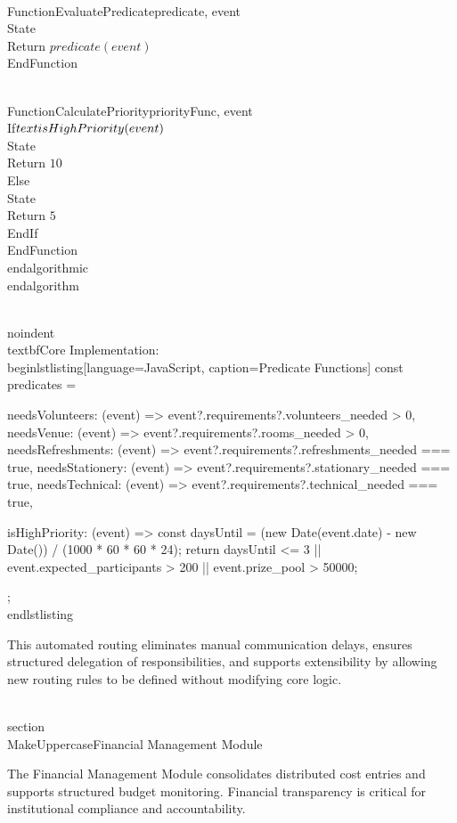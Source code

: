 \\Function{EvaluatePredicate}{predicate, event}
    \\State \\Return $predicate(event)$
\\EndFunction

\\Function{CalculatePriority}{priorityFunc, event}
    \\If{$\\text{isHighPriority}(event)$}
        \\State \\Return $10$
    \\Else
        \\State \\Return $5$
    \\EndIf
\\EndFunction
\\end{algorithmic}
\\end{algorithm}

\\noindent\\textbf{Core Implementation:}
\\begin{lstlisting}[language=JavaScript, caption=Predicate Functions]
const predicates = {
  needsVolunteers: (event) => event?.requirements?.volunteers_needed > 0,
  needsVenue: (event) => event?.requirements?.rooms_needed > 0,
  needsRefreshments: (event) => event?.requirements?.refreshments_needed === true,
  needsStationery: (event) => event?.requirements?.stationary_needed === true,
  needsTechnical: (event) => event?.requirements?.technical_needed === true,
  
  isHighPriority: (event) => {
    const daysUntil = (new Date(event.date) - new Date()) / (1000 * 60 * 60 * 24);
    return daysUntil <= 3 || 
           event.expected_participants > 200 || 
           event.prize_pool > 50000;
  }
};
\\end{lstlisting}

This automated routing eliminates manual communication delays, ensures structured delegation of responsibilities, and supports extensibility by allowing new routing rules to be defined without modifying core logic.

\\section{\\MakeUppercase{Financial Management Module}}

The Financial Management Module consolidates distributed cost entries and supports structured budget monitoring. Financial transparency is critical for institutional compliance and accountability.

